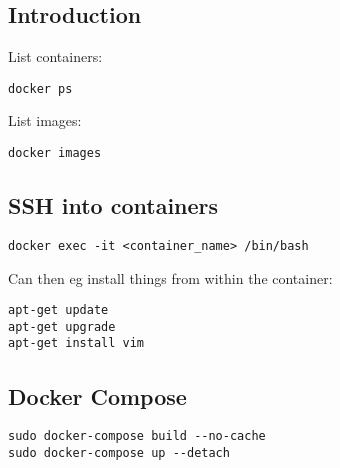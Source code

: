 
\subsection{Introduction}

List containers:
\begin{verbatim}
docker ps
\end{verbatim}

List images:
\begin{verbatim}
docker images
\end{verbatim}

\subsection{SSH into containers}

\begin{verbatim}
docker exec -it <container_name> /bin/bash
\end{verbatim}

Can then eg install things from within the container:

\begin{verbatim}
apt-get update
apt-get upgrade
apt-get install vim
\end{verbatim}


\subsection{Docker Compose}

\begin{verbatim}
sudo docker-compose build --no-cache
sudo docker-compose up --detach
\end{verbatim}

